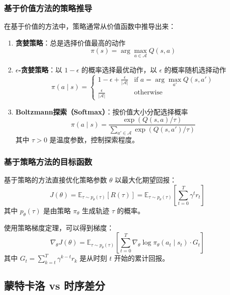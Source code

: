 \subsubsection{基于价值方法的策略推导}
在基于价值的方法中，策略通常从价值函数中推导出来：

\begin{enumerate}
    \item \textbf{贪婪策略}：总是选择价值最高的动作
    \[
    \pi(s) = \arg\max_{a \in \mathcal{A}} Q(s, a)
    \]
    
    \item \textbf{$\epsilon$-贪婪策略}：以 $1-\epsilon$ 的概率选择最优动作，以 $\epsilon$ 的概率随机选择动作
    \[
    \pi(a \mid s) = 
    \begin{cases}
    1 - \epsilon + \frac{\epsilon}{|\mathcal{A}|} & \text{if } a = \arg\max_{a'} Q(s, a') \\
    \frac{\epsilon}{|\mathcal{A}|} & \text{otherwise}
    \end{cases}
    \]
    
    \item \textbf{Boltzmann探索（Softmax）}：按价值大小分配选择概率
    \[
    \pi(a \mid s) = \frac{\exp(Q(s, a)/\tau)}{\sum_{a' \in \mathcal{A}} \exp(Q(s, a')/\tau)}
    \]
    其中 $\tau > 0$ 是温度参数，控制探索程度。
\end{enumerate}

\subsubsection{基于策略方法的目标函数}
基于策略的方法直接优化策略参数 $\theta$ 以最大化期望回报：
\[
J(\theta) = \mathbb{E}_{\tau \sim p_\theta(\tau)}[R(\tau)] = \mathbb{E}_{\tau \sim p_\theta(\tau)}\left[\sum_{t=0}^T \gamma^t r_t\right]
\]
其中 $p_\theta(\tau)$ 是由策略 $\pi_\theta$ 生成轨迹 $\tau$ 的概率。

使用策略梯度定理，可以得到梯度：
\[
\nabla_\theta J(\theta) = \mathbb{E}_{\tau \sim p_\theta(\tau)}\left[\sum_{t=0}^T \nabla_\theta \log \pi_\theta(a_t \mid s_t) \cdot G_t\right]
\]
其中 $G_t = \sum_{k=t}^T \gamma^{k-t} r_k$ 是从时刻 $t$ 开始的累计回报。

\subsection{蒙特卡洛 vs 时序差分}

